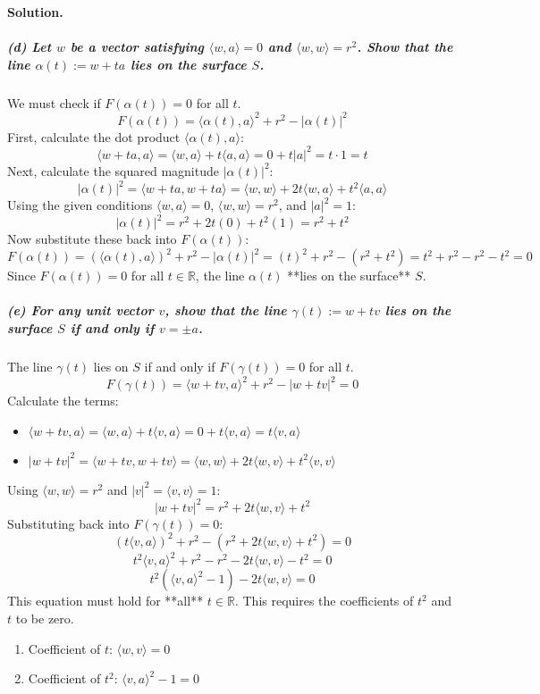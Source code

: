 \documentclass[12pt, a4paper, oneside]{article}
\newenvironment{solution}
  {\par\noindent\textbf{Solution. }\newline}
  {\par}
\begin{document}
\begin{solution}
\subparagraph{(d) Let $w$ be a vector satisfying $\langle w,a\rangle=0$ and $\langle w,w\rangle=r^{2}$. Show that the line $\alpha(t):=w+ta$ lies on the surface $S$.}
We must check if $F(\alpha(t))=0$ for all $t$.
$$
F(\alpha(t)) = \langle \alpha(t),a\rangle^{2} + r^{2} - |\alpha(t)|^{2}
$$
First, calculate the dot product $\langle \alpha(t),a\rangle$:
$$
\langle w+ta, a \rangle = \langle w,a \rangle + t\langle a,a \rangle = 0 + t|a|^2 = t \cdot 1 = t
$$
Next, calculate the squared magnitude $|\alpha(t)|^2$:
$$
|\alpha(t)|^2 = \langle w+ta, w+ta \rangle = \langle w,w \rangle + 2t\langle w,a \rangle + t^2\langle a,a \rangle
$$
Using the given conditions $\langle w,a\rangle=0$, $\langle w,w\rangle=r^2$, and $|a|^2=1$:
$$
|\alpha(t)|^2 = r^2 + 2t(0) + t^2(1) = r^2 + t^2
$$
Now substitute these back into $F(\alpha(t))$:
$$
F(\alpha(t)) = (\langle \alpha(t),a\rangle)^{2} + r^{2} - |\alpha(t)|^{2} = (t)^{2} + r^{2} - (r^{2} + t^{2}) = t^2 + r^2 - r^2 - t^2 = 0
$$
Since $F(\alpha(t))=0$ for all $t \in \mathbb{R}$, the line $\alpha(t)$ **lies on the surface** $S$.

\subparagraph{(e) For any unit vector $v$, show that the line $\gamma(t):=w+tv$ lies on the surface $S$ if and only if $v=\pm a$.}
The line $\gamma(t)$ lies on $S$ if and only if $F(\gamma(t))=0$ for all $t$.
$$
F(\gamma(t)) = \langle w+tv,a\rangle^{2} + r^{2} - |w+tv|^{2} = 0
$$
Calculate the terms:
\begin{itemize}
    \item $\langle w+tv,a\rangle = \langle w,a\rangle + t\langle v,a\rangle = 0 + t\langle v,a\rangle = t\langle v,a\rangle$
    \item $|w+tv|^{2} = \langle w+tv, w+tv \rangle = \langle w,w \rangle + 2t\langle w,v \rangle + t^2\langle v,v \rangle$
\end{itemize}
Using $\langle w,w\rangle=r^2$ and $|v|^2=\langle v,v\rangle=1$:
$$
|w+tv|^{2} = r^2 + 2t\langle w,v \rangle + t^2
$$
Substituting back into $F(\gamma(t))=0$:
$$
(t\langle v,a\rangle)^{2} + r^{2} - (r^{2} + 2t\langle w,v \rangle + t^2) = 0
$$
$$
t^2\langle v,a\rangle^{2} + r^{2} - r^{2} - 2t\langle w,v \rangle - t^2 = 0
$$
$$
t^2(\langle v,a\rangle^{2} - 1) - 2t\langle w,v \rangle = 0
$$
This equation must hold for **all** $t \in \mathbb{R}$. This requires the coefficients of $t^2$ and $t$ to be zero.
\begin{enumerate}
    \item Coefficient of $t$: $\langle w,v \rangle = 0$
    \item Coefficient of $t^2$: $\langle v,a\rangle^{2} - 1 = 0$
\end{enumerate}

\end{solution}
\end{document}

